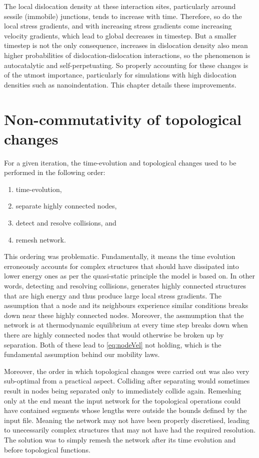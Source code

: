 The local dislocation density at these interaction sites, particularly arround sessile (immobile) junctions, tends to increase with time. Therefore, so do the local stress gradients, and with increasing stress gradients come increasing velocity gradients, which lead to global decreases in timestep. But a smaller timestep is not the only consequence, increases in dislocation density also mean higher probabilities of dislocation-dislocation interactions, so the phenomenon is autocatalytic and self-perpetuating. So properly accounting for these changes is of the utmost importance, particularly for simulations with high dislocation densities such as nanoindentation. This chapter details these improvements.

\section{Non-commutativity of topological changes}\label{s:nonCommutativity}

For a given iteration, the time-evolution and topological changes used to be performed in the following order:
\begin{enumerate}
    \item time-evolution,
    \item separate highly connected nodes,
    \item detect and resolve collisions, and
    \item remesh network.
\end{enumerate}
This ordering was problematic. Fundamentally, it means the time evolution erroneously accounts for complex structures that should have dissipated into lower energy ones as per the quasi-static principle the model is based on. In other words, detecting and resolving collisions, generates highly connected structures that are high energy and thus produce large local stress gradients. The assumption that a node and its neighbours experience similar conditions breaks down near these highly connected nodes. Moreover, the assmumption that the network is at thermodynamic equilibrium at every time step breaks down when there are highly connected nodes that would otherwise be broken up by separation. Both of these lead to \cref{eq:nodeVel} not holding, which is the fundamental assumption behind our mobility laws.

Moreover, the order in which topological changes were carried out was also very sub-optimal from a practical aspect. Colliding after separating would sometimes result in nodes being separated only to immediately collide again. Remeshing only at the end meant the input network for the topological operations could have contained segments whose lengths were outside the bounds defined by the input file. Meaning the network may not have been properly discretised, leading to unecessarily complex structures that may not have had the required resolution. The solution was to simply remesh the network after its time evolution and before topological functions.

